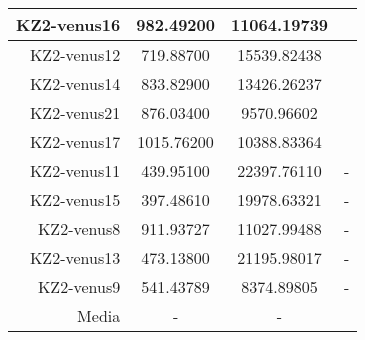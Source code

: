 \documentclass{article}
\begin{document}
\begin{table}
\begin{tabular}{|r|c|c|c|}
        KZ2-venus16 & 982.49200 & 11064.19739 & \\ \hline
        KZ2-venus12 & 719.88700 & 15539.82438 & \\ \hline
        KZ2-venus14 & 833.82900 & 13426.26237 & \\ \hline
        KZ2-venus21 & 876.03400 & 9570.96602 & \\ \hline
        KZ2-venus17 & 1015.76200 & 10388.83364 & \\ \hline
        KZ2-venus11 & 439.95100 & 22397.76110 & - \\ \hline
        KZ2-venus15 & 397.48610 & 19978.63321 & - \\ \hline
        KZ2-venus8 & 911.93727 & 11027.99488 & - \\ \hline
        KZ2-venus13 & 473.13800 & 21195.98017 & - \\ \hline
        KZ2-venus9 & 541.43789 & 8374.89805 & - \\ \hline\hline
        Media & - & - & \\ \hline
    \end{tabular}
\end{table}
\end{document}
